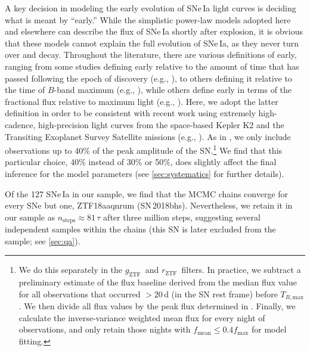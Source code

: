 \documentclass[twocolumn]{./aastex63}
\newcommand{\rztf}{$r_\mathrm{ZTF}$}
\newcommand{\gztf}{$g_\mathrm{ZTF}$}
\newcommand{\tbmax}{$T_{B,\mathrm{max}}$}
\begin{document}
A key decision in modeling the early evolution of SNe\,Ia light curves is
deciding what is meant by ``early.'' While the simplistic power-law models
adopted here and elsewhere can describe the flux of SNe\,Ia shortly after
explosion, it is obvious that these models cannot explain the full evolution
of SNe\,Ia, as they never turn over and decay. Throughout the literature,
there are various definitions of early, ranging from some studies defining
early relative to the amount of time that has passed following the epoch of
discovery (e.g., \citealt{Nugent11,Zheng13,Miller18}), to others defining it
relative to the time of $B$-band maximum (e.g.,
\citealt{Riess99a,Aldering00,Conley06,Dimitriadis19}), while others define
early in terms of the fractional flux relative to maximum light (e.g.,
\citealt{Firth15,Olling15,Fausnaugh19}). Here, we adopt the latter definition
in order to be consistent with recent work using extremely high-cadence,
high-precision light curves from the space-based Kepler K2 \citep{Howell14}
and the Transiting Exoplanet Survey Satellite \citep{Ricker15} missions (e.g.,
\citealt{Olling15,Fausnaugh19}). As in \citet{Olling15}, we only include
observations up to 40\% of the peak amplitude of the SN.\footnote{We do this
separately in the \gztf\ and \rztf\ filters. In practice, we subtract a
preliminary estimate of the flux baseline derived from the median flux value
for all observations that occurred $>20$\,d (in the SN rest frame) before
\tbmax. We then divide all flux values by the peak flux determined in
\citet{Yao19}. Finally, we calculate the inverse-variance weighted mean flux
for every night of observations, and only retain those nights with
$f_\mathrm{mean} \le 0.4 f_\mathrm{max}$ for model fitting.} We find that this
particular choice, 40\% instead of 30\% or 50\%, does slightly affect the
final inference for the model parameters (see \ref{sec:systematics} for
further details).

Of the 127 SNe\,Ia in our sample, we find that the MCMC chains converge for
every SNe but one, ZTF18aaqnrum (SN\,2018bhs). Nevertheless, we retain it in
our sample as $n_\mathrm{steps} \approx 81 \,\tau$ after three million steps,
suggesting several independent samples within the chains (this SN is later
excluded from the sample; see \ref{sec:qa}).
\end{document}
